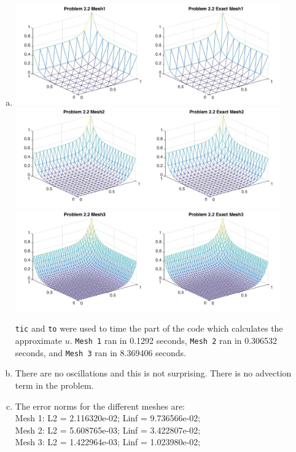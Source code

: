 \documentclass[11pt]{article}
\begin{document}
\begin{enumerate}[(a)]

\item
\begin{center}
\includegraphics[width=0.9\textwidth]{P221.jpg}
\includegraphics[width=0.9\textwidth]{p222.jpg}
\includegraphics[width=0.9\textwidth]{p223.jpg}
\end{center}

\texttt{tic} and \texttt{to} were used to time the part of the code which calculates the approximate $u$. \texttt{Mesh 1} ran in 0.1292 seconds, \texttt{Mesh 2} ran in 0.306532 seconds, and \texttt{Mesh 3} ran in 8.369406 seconds.

\item There are no oscillations and this is not surprising. There is no advection term in the problem.

\item
The error norms for the different meshes  are:\\
Mesh 1: L2 = 2.116320e-02; Linf = 9.736566e-02;\\
Mesh 2: L2 = 5.608765e-03; Linf = 3.422807e-02;\\
Mesh 3: L2 = 1.422964e-03; Linf = 1.023980e-02;


\end{enumerate}
\end{document}
